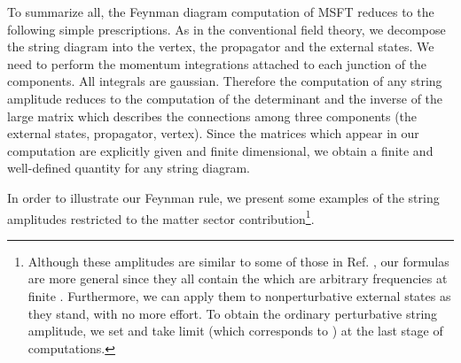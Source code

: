 \documentclass[a4paper,11pt]{article}
\begin{document}
To summarize all, the Feynman diagram computation of MSFT reduces to the
following simple prescriptions. As in the conventional field theory, we
decompose the string diagram into the vertex, the propagator and the
external states. We need to perform the momentum integrations attached to
each junction of the components. All integrals are gaussian. Therefore the
computation of any string amplitude reduces to the computation of the
determinant and the inverse of the large matrix which
describes the connections among three components
(the external states, propagator, vertex).
Since the matrices which appear in our computation are explicitly given and
finite dimensional, we obtain a finite and well-defined quantity for
any string diagram.


In order to illustrate our Feynman rule, we present some examples
of the string amplitudes restricted to the matter sector
contribution\footnote{ Although these amplitudes are similar to
some of those in Ref. \cite{Taylor}, our formulas are more general
since they all contain the \coordHE{} which are
arbitrary frequencies at finite \coordHE{}. Furthermore, we can apply
them to nonperturbative external states as they stand, with no
more effort. To obtain the ordinary perturbative string amplitude,
we set \coordHE{} and take \coordHE{} limit (which corresponds to \coordHE{}) at
the last stage of computations. }.
\end{document}
